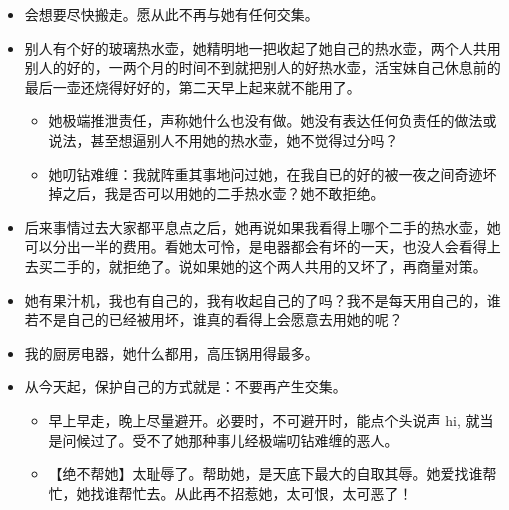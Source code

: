 \documentclass[9pt, b5paper]{article}
\begin{document}
\begin{itemize}
\item 会想要尽快搬走。愿从此不再与她有任何交集。
\item 别人有个好的玻璃热水壶，她精明地一把收起了她自己的热水壶，两个人共用别人的好的，一两个月的时间不到就把别人的好热水壶，活宝妹自己休息前的最后一壶还烧得好好的，第二天早上起来就不能用了。
\begin{itemize}
\item 她极端推泄责任，声称她什么也没有做。她没有表达任何负责任的做法或说法，甚至想逼别人不用她的热水壶，她不觉得过分吗？
\item 她叨钻难缠：我就阵重其事地问过她，在我自已的好的被一夜之间奇迹坏掉之后，我是否可以用她的二手热水壶？她不敢拒绝。
\end{itemize}
\item 后来事情过去大家都平息点之后，她再说如果我看得上哪个二手的热水壶，她可以分出一半的费用。看她太可怜，是电器都会有坏的一天，也没人会看得上去买二手的，就拒绝了。说如果她的这个两人共用的又坏了，再商量对策。
\item 她有果汁机，我也有自己的，我有收起自己的了吗？我不是每天用自己的，谁若不是自己的已经被用坏，谁真的看得上会愿意去用她的呢？
\item 我的厨房电器，她什么都用，高压锅用得最多。

\item 从今天起，保护自己的方式就是：不要再产生交集。
\begin{itemize}
\item 早上早走，晚上尽量避开。必要时，不可避开时，能点个头说声 hi, 就当是问候过了。受不了她那种事儿经极端叨钻难缠的恶人。
\item 【绝不帮她】太耻辱了。帮助她，是天底下最大的自取其辱。她爱找谁帮忙，她找谁帮忙去。从此再不招惹她，太可恨，太可恶了！
\end{itemize}
\end{itemize}
\end{document}
